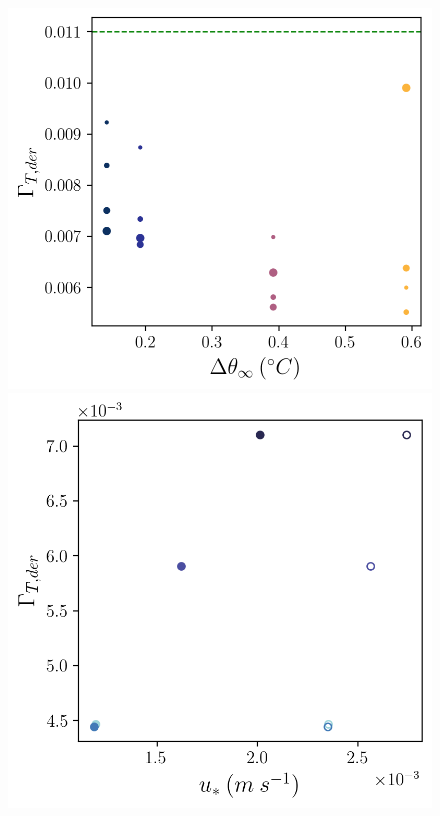 \documentclass[draft]{styles/agujournal2019}
\begin{document}
\begin{figure}[h!]
\begin{minipage}{0.5\textwidth}
    \end{minipage}
    \begin{minipage}{0.5\textwidth}
        \includegraphics[trim={0 0 0 0cm},clip,width=\textwidth]{Figures/gammaT_dT_cmp_dT_43h_tav13h.png}
    \end{minipage}%
    \begin{minipage}{0.5\textwidth}
        \includegraphics[trim={0 0 0 0cm},clip,width=\textwidth]{Figures/gammaT_us_cmp_dslope_43h_tav13h.png}

\end{minipage}
\end{figure}
\end{document}
